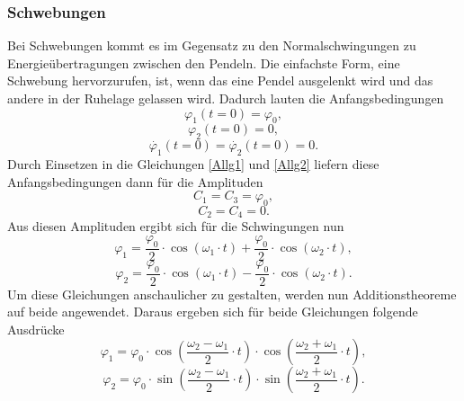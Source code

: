 \newpage
\subsubsection{Schwebungen}
Bei Schwebungen kommt es im Gegensatz zu den Normalschwingungen zu Energieübertragungen zwischen den Pendeln. Die einfachste Form, eine Schwebung hervorzurufen, ist, wenn das eine Pendel ausgelenkt wird und das andere in der Ruhelage gelassen wird. Dadurch lauten die Anfangsbedingungen
\begin{equation*}
    \varphi_1\left(t=0\right) = \varphi_0,
\end{equation*}
\begin{equation*}
    \varphi_2\left(t=0\right) = 0,
\end{equation*}
\begin{equation*}
    \dot{\varphi_1}\left(t=0\right) = \dot{\varphi_2}\left(t=0\right) = 0.
\end{equation*}
Durch Einsetzen in die Gleichungen \ref{Allg1} und \ref{Allg2} liefern diese Anfangsbedingungen dann für die Amplituden
\begin{equation*}
    C_1 = C_3 = \varphi_0,
\end{equation*}
\begin{equation*}
    C_2 = C_4 = 0.
\end{equation*}
Aus diesen Amplituden ergibt sich für die Schwingungen nun
\begin{equation}
    \varphi_1 = \frac{\varphi_0}{2} \cdot \cos\left(\omega_1 \cdot t\right) + \frac{\varphi_0}{2} \cdot \cos\left(\omega_2 \cdot t\right),
\end{equation}
\begin{equation}
    \varphi_2 = \frac{\varphi_0}{2} \cdot \cos\left(\omega_1 \cdot t\right) - \frac{\varphi_0}{2} \cdot \cos\left(\omega_2 \cdot t\right).
\end{equation}
Um diese Gleichungen anschaulicher zu gestalten, werden nun Additionstheoreme auf beide angewendet. Daraus ergeben sich für beide Gleichungen folgende Ausdrücke
\begin{equation}
    \varphi_1 = \varphi_0 \cdot \cos\left(\frac{\omega_2 - \omega_1}{2} \cdot t\right) \cdot \cos\left(\frac{\omega_2 + \omega_1}{2} \cdot t\right),
    \label{Schwebung1}
\end{equation}
\begin{equation}
    \varphi_2 = \varphi_0 \cdot \sin\left(\frac{\omega_2 - \omega_1}{2} \cdot t\right) \cdot \sin\left(\frac{\omega_2 + \omega_1}{2} \cdot t\right).
    \label{Schwebung2}
\end{equation}

